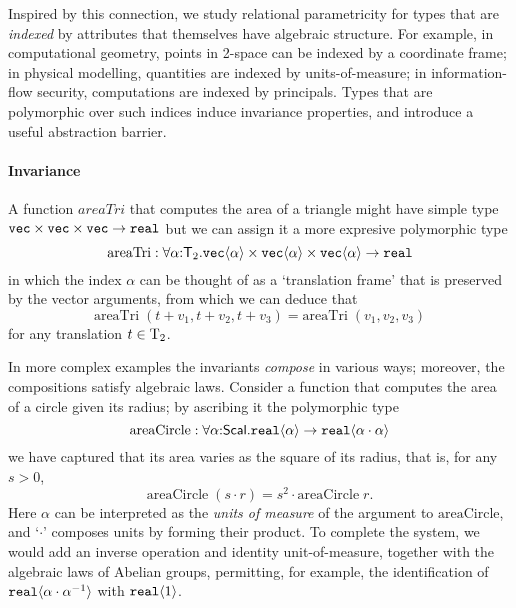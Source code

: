 Inspired by this connection, we study relational parametricity for
types that are \emph{indexed} by attributes that themselves have
algebraic structure.  For example, in computational geometry, points
in 2-space can be indexed by a coordinate frame; in physical
modelling, quantities are indexed by units-of-measure; in
information-flow security, computations are indexed by principals.
Types that are polymorphic over such indices induce invariance
properties, and introduce a useful abstraction barrier.

\paragraph{Invariance}
A function $\mathit{areaTri}$ that computes the area of a triangle might
have simple type $\texttt{vec}\times\texttt{vec}\times\texttt{vec}\to\texttt{real}$
but we can assign it a more expresive polymorphic type
\[
\mathrm{areaTri} : \forall\alpha\mathord:\mathsf{T}_2.
  \textup{\texttt{vec}}\langle \alpha \rangle \times \textup{\texttt{vec}}\langle \alpha \rangle \times \textup{\texttt{vec}}\langle \alpha \rangle \to \texttt{real} \\
\]
in which the index $\alpha$ can be thought of as a `translation frame' that is
preserved by the vector arguments, from which we can deduce that
\[
\mathrm{areaTri}\;(t + v_1, t + v_2, t + v_3) = 
\mathrm{areaTri}\;(v_1, v_2, v_3)
\]
for any translation $t\in\mathrm{T}_2$.

In more complex examples the invariants \emph{compose} in various
ways; moreover, the compositions satisfy algebraic laws. Consider a function
that computes the area of a circle given its radius; by ascribing it
the polymorphic type
\[
\mathrm{areaCircle} : \forall\alpha\mathord:\mathsf{Scal}.\textup{\texttt{real}}\langle \alpha \rangle\to
\textup{\texttt{real}}\langle \alpha\cdot\alpha \rangle
\]
we have captured that its area varies as the square of its radius, that is, for any $s>0$,
\[
\mathrm{areaCircle}\;(s\cdot r) = s^2\cdot \mathrm{areaCircle}\;r.
\]
Here $\alpha$ can be interpreted as the \emph{units of measure} of the argument
to $\mathrm{areaCircle}$, and `$\cdot$' composes units by forming
their product. To complete the system, we would add an inverse
operation and identity unit-of-measure, together with the algebraic laws of
Abelian groups, permitting, for example, the identification of
$\textup{\texttt{real}}\langle \alpha\cdot\alpha^{-1} \rangle$ with $\textup{\texttt{real}}\langle 1 \rangle$.

